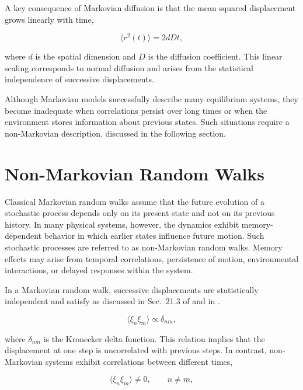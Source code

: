 A key consequence of Markovian diffusion is that the mean squared displacement grows linearly with time,

\begin{equation}
\langle r^2(t) \rangle
=
2dDt,
\end{equation}

where $d$ is the spatial dimension and $D$ is the diffusion coefficient. This linear scaling corresponds to normal diffusion and arises from the statistical independence of successive displacements.

Although Markovian models successfully describe many equilibrium systems, they become inadequate when correlations persist over long times or when the environment stores information about previous states. Such situations require a non-Markovian description, discussed in the following section.

\section{Non-Markovian Random Walks}

Classical Markovian random walks assume that the future evolution of a stochastic process\cite{balakrishnan2021,schutz2004} depends only on its present state and not on its previous history. In many physical systems, however, the dynamics exhibit memory-dependent behavior in which earlier states influence future motion. Such stochastic processes are referred to as non-Markovian random walks. Memory effects may arise from temporal correlations, persistence of motion, environmental interactions, or delayed responses within the system.

In a Markovian random walk, successive displacements are statistically independent and satisfy as discussed in Sec.~21.3 of \cite{balakrishnanMathematical} and in \cite{resnick1992}.

\begin{equation}
\langle \xi_n \xi_m \rangle
\propto
\delta_{nm},
\end{equation}

where $\delta_{nm}$ is the Kronecker delta function. This relation implies that the displacement at one step is uncorrelated with previous steps. In contrast, non-Markovian systems exhibit correlations between different times,

\begin{equation}
\langle \xi_n \xi_m \rangle
\neq 0,
\qquad
n\neq m,
\end{equation}

